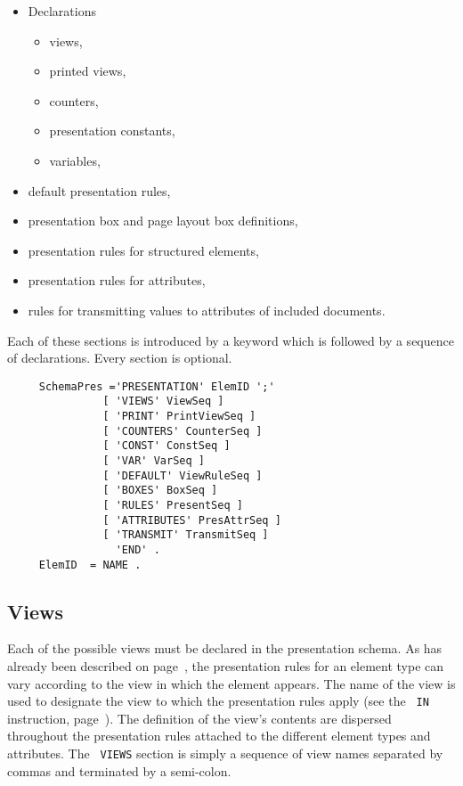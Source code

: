 \begin{itemize}
\item
Declarations
   \begin{itemize}
   \item
   views,
   \item
   printed views,
   \item
   counters,
   \item
   presentation constants,
   \item
   variables,
   \end{itemize}
\item
default presentation rules,
\item
presentation box and page layout box definitions,
\item
presentation rules for structured elements,
\item
presentation rules for attributes,
\item
rules for transmitting values to attributes of included documents.
\end{itemize}

Each of these sections is introduced by a keyword which is followed by
a sequence of declarations.  Every section is optional.

\begin{verbatim}
     SchemaPres ='PRESENTATION' ElemID ';'
               [ 'VIEWS' ViewSeq ]
               [ 'PRINT' PrintViewSeq ]
               [ 'COUNTERS' CounterSeq ]
               [ 'CONST' ConstSeq ]
               [ 'VAR' VarSeq ]
               [ 'DEFAULT' ViewRuleSeq ]
               [ 'BOXES' BoxSeq ]
               [ 'RULES' PresentSeq ]
               [ 'ATTRIBUTES' PresAttrSeq ]
               [ 'TRANSMIT' TransmitSeq ]
                 'END' .
     ElemID  = NAME .
\end{verbatim}

\subsection{Views}

Each of the possible views must be declared in the presentation
schema.  As has already been described on page~\pageref{lesvues}, the
presentation rules for an element type can vary according to the view
in which the element appears.  The name of the view is used to
designate the view to which the presentation rules apply (see the {\tt
IN} instruction, page~\pageref{instrin}).  The definition of the
view's contents are dispersed throughout the presentation rules
attached to the different element types and attributes.  The {\tt
VIEWS} section is simply a sequence of view names separated by commas
and terminated by a semi-colon.

